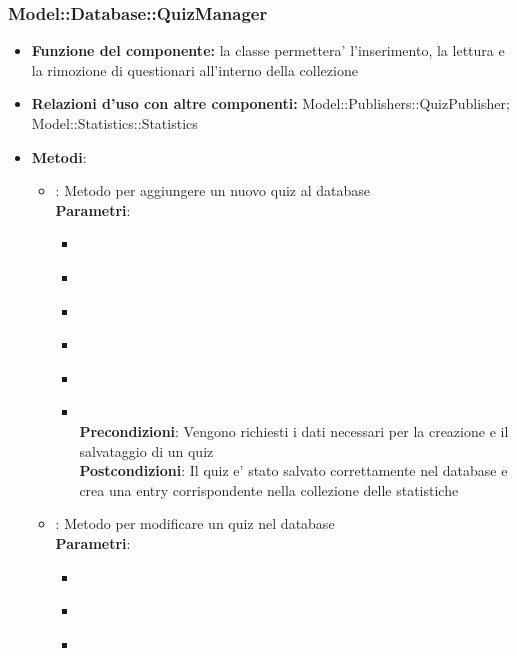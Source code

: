 \subsubsection{Model::Database::QuizManager}
\begin{itemize}
\item\textbf{Funzione del componente:} la classe permettera' l'inserimento, la lettura e la rimozione di questionari all'interno della collezione
\item\textbf{Relazioni d'uso con altre componenti:} Model::Publishers::QuizPublisher; Model::Statistics::Statistics\\
\item\textbf{Metodi}:
\begin{itemize}
	\item{} : Metodo per aggiungere un nuovo quiz al database\\
	\textbf{Parametri}:
	\begin{itemize}
		\item{}\\
		\item{}\\
		\item{}\\
		\item{}\\
		\item{}\\
		\item{}\\
		\textbf{Precondizioni}: Vengono richiesti i dati necessari per la creazione e il salvataggio di un quiz\\
		\textbf{Postcondizioni}: Il quiz e' stato salvato correttamente nel database e crea una entry corrispondente nella collezione delle statistiche\\
	\end{itemize}
	\item{} :  Metodo per modificare un quiz nel database\\
	\textbf{Parametri}:
	\begin{itemize}
		\item{}\\
		\item{}\\
		\item{}\\

\end{itemize}
\end{itemize}
\end{itemize}
